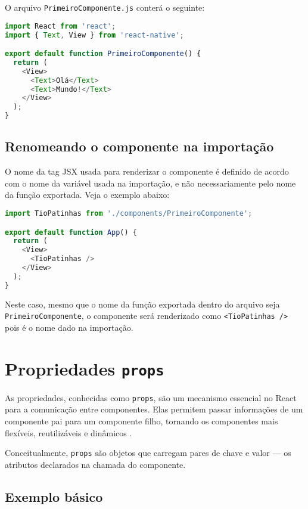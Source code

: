 O arquivo \texttt{PrimeiroComponente.js} conterá o seguinte:

\begin{lstlisting}[language=JavaScript, caption={Conteúdo de PrimeiroComponente.js}]
import React from 'react';
import { Text, View } from 'react-native';

export default function PrimeiroComponente() {
  return (
    <View>
      <Text>Olá</Text>
      <Text>Mundo!</Text>
    </View>
  );
}
\end{lstlisting}

\subsection*{Renomeando o componente na importação}

O nome da tag JSX usada para renderizar o componente é definido de acordo com o nome da variável usada na importação, e não necessariamente pelo nome da função exportada. Veja o exemplo abaixo:

\begin{lstlisting}[language=JavaScript, caption={Importando com outro nome}]
import TioPatinhas from './components/PrimeiroComponente';

export default function App() {
  return (
    <View>
      <TioPatinhas />
    </View>
  );
}
\end{lstlisting}

Neste caso, mesmo que o nome da função exportada dentro do arquivo seja \texttt{PrimeiroComponente}, o componente será renderizado como \texttt{<TioPatinhas />} pois é o nome dado na importação.

\section{Propriedades \texttt{props}}

As propriedades, conhecidas como \texttt{props}, são um mecanismo essencial no React para a comunicação entre componentes. Elas permitem passar informações de um componente pai para um componente filho, tornando os componentes mais flexíveis, reutilizáveis e dinâmicos \cite{rocketseatComponents}.

Conceitualmente, \texttt{props} são objetos que carregam pares de chave e valor — os atributos declarados na chamada do componente.

\subsection*{Exemplo básico}

